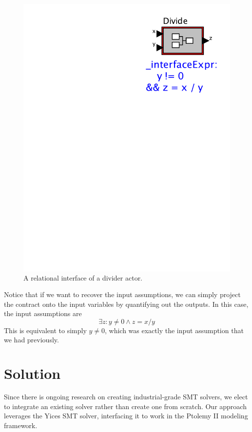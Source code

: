 \documentclass[preprint,11pt]{sigplanconf}
\begin{document}
\begin{figure}[htbp]
\centering
\includegraphics[scale=0.6]{figs/Divide2} 
\caption{A relational interface of a divider actor.}
\label{fig:dividerNew}
\end{figure}

Notice that if we want to recover the input assumptions, we can simply project
the contract onto the input variables by quantifying out the outputs.
In this case, the input assumptions are 
\[
\exists z : y \ne 0 \wedge z = x / y 
\]
This is equivalent to simply $y \ne 0$, which was exactly the input assumption
that we had previously.

\section{Solution}
Since there is ongoing research on creating industrial-grade SMT solvers,
we elect to integrate an existing solver rather than create one from scratch.
Our approach leverages the Yices\cite{yices} SMT solver, interfacing it to
work in the Ptolemy II\cite{ptII} modeling framework.
\end{document}
